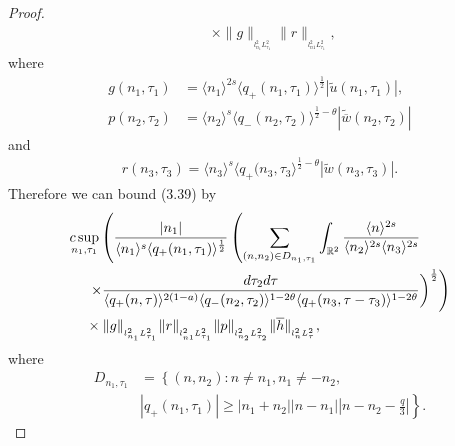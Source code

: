 \documentclass[reqno]{amsart}
\numberwithin{equation}{section}
\begin{document}
\begin{proof}
\begin{equation}
\begin{split}
&\quad\times\| g\|
_{_{l_{n_{1}}^{2}L_{\tau_{1}}^{2}}}\| r\|
_{_{l_{n1}^{2}L_{\tau_{1}}^{2}}}\text{,}
\end{split}
\end{equation}
where
\begin{equation*}
\begin{split}
g\left(  n_{1},\tau_{1}\right) &=\langle n_{1}\rangle^{2s}\langle q_{+}(n_{1},\tau_{1})\rangle^{\frac{1}{2}}|\widetilde{u}(n_{1},\tau_{1})|, \\
p(n_{2},\tau_{2})&=\langle n_{2}\rangle^{s}\langle q_{-}(n_{2},\tau_{2})\rangle^{\frac{1}{2}-\theta}| \widetilde{\overline{w}}(n_{2},\tau_{2})|
\end{split}
\end{equation*}
and
\begin{equation*}
\begin{split}
r(n_3,\tau_3)=\langle n_3\rangle^{s}\langle q_{+}(n_3
,\tau_3\rangle^{\frac{1}{2}-\theta}|\widetilde{w}(n_3,\tau_3)| .
\end{split}
\end{equation*}
Therefore we can bound (3.39) by
\begin{equation}\label{4.43}
\begin{split}
&  \underset{n_{1},\tau_{1}}{c\sup}\left(  \frac{|n_1|
}{\langle n_{1}\rangle^{s}\langle q_{+}(n_{1},\tau_{1})\rangle^{\frac{1}{2}}}\left(  \sum\limits_{(n,n_{2})\in D_{n_{1},\tau_{1}}}\int
\nolimits_{\mathbb{R}^{2}}\frac{\langle n\rangle^{2s}}{\langle n_{2}\rangle^{2s}\langle n_3\rangle^{2s}}\right.  \right. \nonumber\\
& \hspace{0.4cm} \left.  \left.  \times\frac{d\tau_{2}d\tau}{\langle
q_{+}(n,\tau )\rangle^{2(1-a)}\langle
q_{-}(n_{2},\tau_{2})\rangle^{1-2\theta}\langle
q_{+}(n_3,\tau-\tau_3)\rangle^{1-2\theta}}\right)
^{\frac{1}{2}}\right) \\
& \hspace{0.4cm} \times\| g\|
_{_{l_{n_{1}}^{2}L_{\tau_{1}}^{2}}}\| r\|
_{_{l_{n1}^{2}L_{\tau_{1}}^{2}}}\| p\|
_{_{l_{n_{2}}^{2}L_{\tau_{2}}^{2}}}\|
\overline{h}\|
_{_{l_{n}^{2}L_{\tau}^{2}}}\text{,}\nonumber
\end{split}
\end{equation}
where
\begin{equation*}
\begin{split}
D_{n_{1},\tau_{1}}  &  =\left\{  \left(  n,n_{2}\right)  :n\neq n_{1},n_{1}\neq-n_{2},\right. \\
&  \left.  | q_{+}(n_{1},\tau_{1})|
\geq  |n_{1}+n_{2}| | n-n_{1}| | n-n_2-\frac{q}{3}| \right\}.

\end{split}
\end{equation*}
\end{proof}
\end{document}
